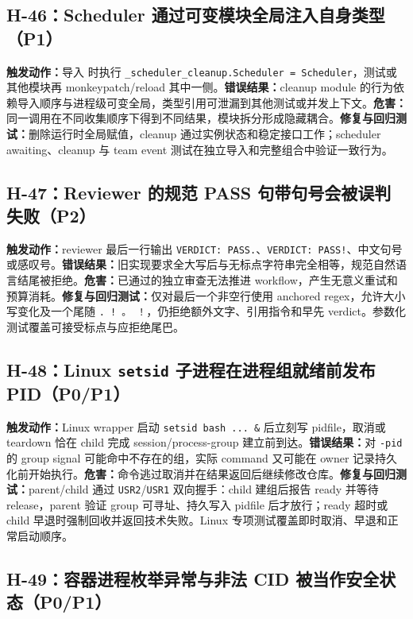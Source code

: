 \documentclass[11pt,a4paper,fontset=fandol]{ctexart}
\newcommand{\code}[1]{\texttt{#1}}
\begin{document}
\subsection{H-46：Scheduler 通过可变模块全局注入自身类型（P1）}

\textbf{触发动作：}导入  时执行 \code{\_scheduler\_cleanup.Scheduler = Scheduler}，测试或其他模块再 monkeypatch/reload 其中一侧。\textbf{错误结果：}cleanup module 的行为依赖导入顺序与进程级可变全局，类型引用可泄漏到其他测试或并发上下文。\textbf{危害：}同一调用在不同收集顺序下得到不同结果，模块拆分形成隐藏耦合。\textbf{修复与回归测试：}删除运行时全局赋值，cleanup 通过实例状态和稳定接口工作；scheduler awaiting、cleanup 与 team event 测试在独立导入和完整组合中验证一致行为。

\subsection{H-47：Reviewer 的规范 PASS 句带句号会被误判失败（P2）}

\textbf{触发动作：}reviewer 最后一行输出 \code{VERDICT: PASS.}、\code{VERDICT: PASS!}、中文句号或感叹号。\textbf{错误结果：}旧实现要求全大写后与无标点字符串完全相等，规范自然语言结尾被拒绝。\textbf{危害：}已通过的独立审查无法推进 workflow，产生无意义重试和预算消耗。\textbf{修复与回归测试：}仅对最后一个非空行使用 anchored regex，允许大小写变化及一个尾随 \code{. ! 。 ！}，仍拒绝额外文字、引用指令和早先 verdict。参数化测试覆盖可接受标点与应拒绝尾巴。

\subsection{H-48：Linux \code{setsid} 子进程在进程组就绪前发布 PID（P0/P1）}

\textbf{触发动作：}Linux wrapper 启动 \code{setsid bash ... \&} 后立刻写 pidfile，取消或 teardown 恰在 child 完成 session/process-group 建立前到达。\textbf{错误结果：}对 \code{-pid} 的 group signal 可能命中不存在的组，实际 command 又可能在 owner 记录持久化前开始执行。\textbf{危害：}命令逃过取消并在结果返回后继续修改仓库。\textbf{修复与回归测试：}parent/child 通过 \code{USR2}/\code{USR1} 双向握手：child 建组后报告 ready 并等待 release，parent 验证 group 可寻址、持久写入 pidfile 后才放行；ready 超时或 child 早退时强制回收并返回技术失败。Linux 专项测试覆盖即时取消、早退和正常启动顺序。

\subsection{H-49：容器进程枚举异常与非法 CID 被当作安全状态（P0/P1）}
\end{document}
